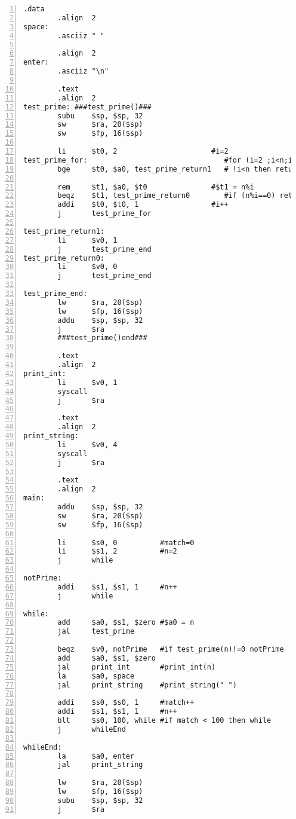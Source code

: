 \documentclass[11pt]{jarticle}
\begin{document}
\begin{lstlisting}[caption=100個の素数を求める,label=100個の素数を求める,numbers=left]
        .data
        .align  2
space:
        .asciiz " "

        .align  2
enter:
        .asciiz "\n"
        
        .text
        .align  2
test_prime: ###test_prime()###
        subu    $sp, $sp, 32
        sw      $ra, 20($sp)
        sw      $fp, 16($sp)
        
        li      $t0, 2                      #i=2
test_prime_for:                                #for (i=2 ;i<n;i++)
        bge     $t0, $a0, test_prime_return1   # !i<n then return 1 ;
        
        rem     $t1, $a0, $t0               #$t1 = n%i
        beqz    $t1, test_prime_return0        #if (n%i==0) return 0 ;
        addi    $t0, $t0, 1                 #i++
        j       test_prime_for        
        
test_prime_return1:
        li      $v0, 1
        j       test_prime_end
test_prime_return0:
        li      $v0, 0
        j       test_prime_end
        
test_prime_end:    
        lw      $ra, 20($sp)
        lw      $fp, 16($sp)
        addu    $sp, $sp, 32
        j       $ra
        ###test_prime()end###
        
        .text
        .align  2
print_int:
        li      $v0, 1
        syscall
        j       $ra

        .text
        .align  2
print_string:
        li      $v0, 4
        syscall
        j       $ra
        
        .text
        .align  2
main:
        addu    $sp, $sp, 32
        sw      $ra, 20($sp)
        sw      $fp, 16($sp)
        
        li      $s0, 0          #match=0
        li      $s1, 2          #n=2
        j       while
        
notPrime:
        addi    $s1, $s1, 1     #n++
        j       while
        
while:
        add     $a0, $s1, $zero #$a0 = n
        jal     test_prime

        beqz    $v0, notPrime   #if test_prime(n)!=0 notPrime
        add     $a0, $s1, $zero 
        jal     print_int       #print_int(n)
        la      $a0, space      
        jal     print_string    #print_string(" ")
        
        addi    $s0, $s0, 1     #match++
        addi    $s1, $s1, 1     #n++
        blt     $s0, 100, while #if match < 100 then while
        j       whileEnd    
        
whileEnd:
        la      $a0, enter
        jal     print_string

        lw      $ra, 20($sp)
        lw      $fp, 16($sp)
        subu    $sp, $sp, 32
        j       $ra

\end{lstlisting}
\end{document}
